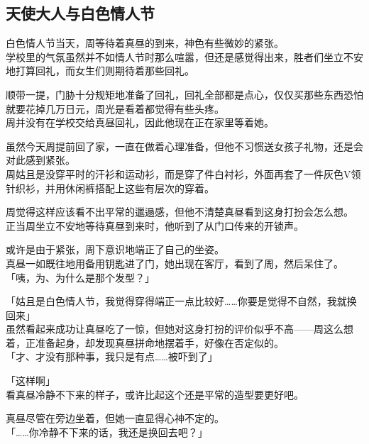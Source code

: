 \subsection{天使大人与白色情人节}

白色情人节当天，周等待着真昼的到来，神色有些微妙的紧张。\\

学校里的气氛虽然并不如情人节时那么喧嚣，但还是感觉得出来，胜者们坐立不安地打算回礼，而女生们则期待着那些回礼。

顺带一提，门胁十分规矩地准备了回礼，回礼全部都是点心，仅仅买那些东西恐怕就要花掉几万日元，周光是看着都觉得有些头疼。\\

周并没有在学校交给真昼回礼，因此他现在正在家里等着她。

虽然今天周提前回了家，一直在做着心理准备，但他不习惯送女孩子礼物，还是会对此感到紧张。\\

周姑且是没穿平时的汗衫和运动衫，而是穿了件白衬衫，外面再套了一件灰色V领针织衫，并用休闲裤搭配上这些有层次的穿着。

周觉得这样应该看不出平常的邋遢感，但他不清楚真昼看到这身打扮会怎么想。\\

正当周坐立不安地等待真昼到来时，他听到了从门口传来的开锁声。

或许是由于紧张，周下意识地端正了自己的坐姿。\\

真昼一如既往地用备用钥匙进了门，她出现在客厅，看到了周，然后呆住了。\\

「咦，为、为什么是那个发型？」

「姑且是白色情人节，我觉得穿得端正一点比较好……你要是觉得不自然，我就换回来」\\

虽然看起来成功让真昼吃了一惊，但她对这身打扮的评价似乎不高——周这么想着，正准备起身，却发现真昼拼命地摆着手，好像在否定似的。\\

「才、才没有那种事，我只是有点……被吓到了」

「这样啊」\\

看真昼冷静不下来的样子，或许比起这个还是平常的造型要更好吧。

真昼尽管在旁边坐着，但她一直显得心神不定的。\\

「……你冷静不下来的话，我还是换回去吧？」

